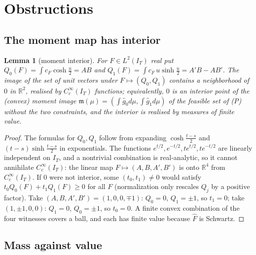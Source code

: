 \documentclass[11pt]{amsart}
\newtheorem{lemma}[theorem]{Lemma}
\theoremstyle{definition}
\theoremstyle{remark}
\newcommand{\R}{\mathbb R}
\newcommand{\IT}{I_T}
\newcommand{\gh}[1]{\widehat g_{#1}}
\newcommand{\Fh}{\widehat F}
\newcommand{\cF}{c_F}
\begin{document}
\section{Obstructions}\label{sec:negative}

\subsection{The moment map has interior}

\begin{lemma}[moment interior]\label{lem:W}
For $F\in L^2(\IT)$ real put $Q_0(F)=\int\cF\cosh\frac u2=A B$ and
$Q_1(F)=\int\cF\,u\sinh\frac u2=A'B-AB'$. The image of the set of unit vectors under
$F\mapsto(Q_0,Q_1)$ contains a neighborhood of $0$ in $\R^2$, realised by $C_c^\infty(\IT)$
functions; equivalently, $0$ is an interior point of the (convex) moment image
$\mathfrak m(\mu)=(\int\gh0d\mu,\int\gh1d\mu)$ of the feasible set of (P) without the two
constraints, and the interior is realised by measures of finite value.
\end{lemma}
\begin{proof}
The formulas for $Q_0,Q_1$ follow from expanding $\cosh\frac{t-s}2$ and $(t-s)\sinh\frac{t-s}2$
in exponentials. The functions $e^{t/2},e^{-t/2},te^{t/2},te^{-t/2}$ are linearly independent
on $\IT$, and a nontrivial combination is real-analytic, so it cannot annihilate
$C_c^\infty(\IT)$: the linear map $F\mapsto(A,B,A',B')$ is onto $\R^4$ from $C_c^\infty(\IT)$.
If $0$ were not interior, some $(t_0,t_1)\ne0$ would satisfy $t_0Q_0(F)+t_1Q_1(F)\ge0$ for all
$F$ (normalization only rescales $Q_j$ by a positive factor). Take $(A,B,A',B')=(1,0,0,\mp1)$:
$Q_0=0$, $Q_1=\pm1$, so $t_1=0$; take $(1,\pm1,0,0)$: $Q_1=0$, $Q_0=\pm1$, so $t_0=0$. A finite
convex combination of the four witnesses covers a ball, and each has finite value because
$\Fh$ is Schwartz.
\end{proof}

\subsection{Mass against value}
\end{document}
